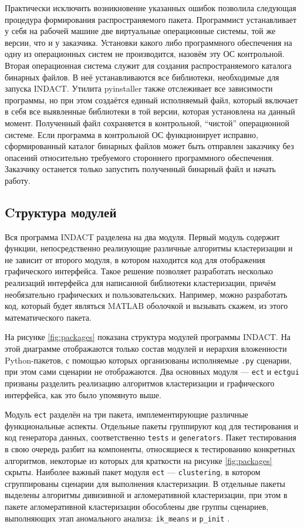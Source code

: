 \documentclass[12pt]{diploma}
\begin{document}
	Практически исключить возникновение указанных ошибок позволила следующая процедура формирования распространяемого пакета. Программист устанавливает у себя на рабочей машине две виртуальные операционные системы, той же версии, что и у заказчика. Установки какого либо программного обеспечения на одну из операционных систем не производится, назовём эту ОС контрольной. Вторая операционная система служит для создания распространяемого каталога бинарных файлов. В неё устанавливаются все библиотеки, необходимые для запуска INDACT. Утилита pyinstaller \cite{Pyinstaller} также отслеживает все зависимости программы, но при этом создаётся единый исполняемый файл, который включает в себя все выявленные библиотеки в той версии, которая установлена на данный момент. Полученный файл сохраняется в контрольной, ``чистой'' операционной системе. Если программа в контрольной ОС функционирует исправно, сформированный каталог бинарных файлов может быть отправлен заказчику без опасений относительно требуемого стороннего программного обеспечения. Заказчику останется только запустить полученный бинарный файл и начать работу.
	
	\subsection{Cтруктура модулей}
	Вся программа INDACT разделена на два модуля. Первый модуль содержит функции, непосредственно реализующие различные алгоритмы кластеризации и не зависит от второго модуля, в котором находится код для отображения графического интерфейса. Такое решение позволяет разработать несколько реализаций интерфейса для написанной библиотеки кластеризации, причём необязательно графических и пользовательских. Например, можно разработать код, который будет являться MATLAB оболочкой и вызывать скажем, \dePDDP из этого математического пакета. 
	
	На рисунке \ref{fig:packages} показана структура модулей программы INDACT. На этой диаграмме отображаются только состав модулей и иерархия вложенности Python-пакетов, с помощью которых организованы исполняемые \texttt{.py} сценарии, при этом сами сценарии не отображаются. Два основных модуля --- \texttt{ect} и \texttt{ectgui} призваны разделить реализацию алгоритмов кластеризации и графического интерфейса, как это было упомянуто выше. 
	
	Модуль \texttt{ect} разделён на три пакета, имплементирующие различные функциональные аспекты. Отдельные пакеты группируют код для тестирования и код генератора данных, соответственно \texttt{tests} и \texttt{generators}. Пакет тестирования в свою очередь разбит на компоненты, относящиеся к тестированию конкретных алгоритмов, некоторые из которых для краткости на рисунке \ref{fig:packages} скрыты. Наиболее важный пакет модуля \texttt{ect} --- \texttt{clustering}, в котором сгруппированы сценарии для выполнения кластеризации. В отдельные пакеты выделены алгоритмы дивизивной и агломеративной кластеризации, при этом в пакете агломеративной кластеризации обособлены две группы сценариев, выполняющих этап аномального анализа: \texttt{ik\_means} и \texttt{p\_init} .
	
\end{document}
